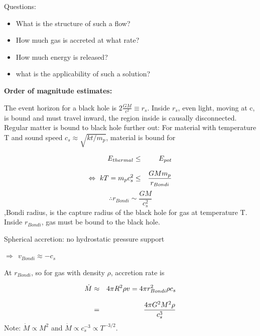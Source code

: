 Questions:

\begin{itemize}
   \item What is the structure of such a flow?
   \item How much gas is accreted at what rate?
   \item How much energy is released?
   \item what is the applicability of such a solution?
\end{itemize}

\textbf{ Order of magnitude estimates:}

The event horizon for a black hole is $2\frac{GM}{c^{2}} \equiv r_{s}$. Inside $r_{s}$, even
light, moving at c, is bound and must travel inward, the region inside is causally disconnected.
Regular matter is bound to black hole further out: For material with temperature T and sound
speed $c_{s} \approx \sqrt{kt/m_{p}}$, material is bound for

\begin{eqnarray}
   E_{thermal} &\le& E_{pot} \nonumnext
   \Leftrightarrow ~ kT = m_{p}c_{s}^{2} &\le& \frac{G M m_{p}}{r_{Bondi}}
\end{eqnarray}
\begin{equation}
   \therefore r_{Bondi} \sim \frac{GM}{c_{s}^2}
\end{equation}
,Bondi radius, is the capture radius of the black hole for gas at temperature T. Inside
$r_{Bondi}$, gas must be bound to the black hole.

Spherical accretion: no hydrostatic pressure support

$\Rightarrow ~~ v_{Bondi} \approx -c_{s}$

At $r_{Bondi}$, so for gas with density $\rho$, accretion rate is

\begin{eqnarray}
   \dot{M} &\approx& 4\pi R^{2}\rho v = 4\pi r_{Bondi}^2 \rho c_{s} \nonumnext
           &=& \frac{4\pi G^{2}M^{2}\rho}{c_{s}^3}
\end{eqnarray}
Note: $\dot{M} \propto M^{2}$ and $\dot{M} \propto c_{s}^{-3} \propto T^{-3/2}$.



